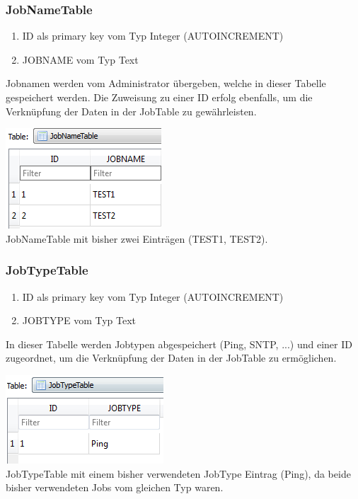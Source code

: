 \documentclass[12pt,a4paper]{report}
\begin{document}
\begin{onehalfspace}
\subsubsection{JobNameTable}
\begin{enumerate}
\item ID als primary key vom Typ Integer (AUTOINCREMENT)
\item JOBNAME vom Typ Text
\end{enumerate}
Jobnamen werden vom Administrator übergeben, welche in dieser Tabelle gespeichert werden. Die Zuweisung zu einer ID erfolg ebenfalls, um die Verknüpfung der Daten in der JobTable zu gewährleisten.
\begin{center}
\includegraphics[scale=0.8]{img/db-tb-jobname.png}\\
JobNameTable mit bisher zwei Einträgen (TEST1, TEST2).
\end{center}
\subsubsection{JobTypeTable}
\begin{enumerate}
\item ID als primary key vom Typ Integer (AUTOINCREMENT)
\item JOBTYPE vom Typ Text
\end{enumerate}
In dieser Tabelle werden Jobtypen abgespeichert (Ping, SNTP, ...) und einer ID zugeordnet, um die Verknüpfung der Daten in der JobTable zu ermöglichen.
\begin{center}
\includegraphics[scale=0.8]{img/db-tb-jobtype.png}\\
JobTypeTable mit einem bisher verwendeten JobType Eintrag (Ping), da beide bisher verwendeten Jobs vom gleichen Typ waren.
\end{center}

\end{onehalfspace}
\end{document}
